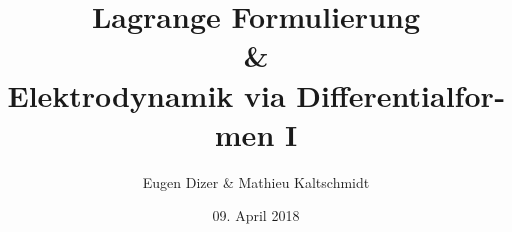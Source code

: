 \title{Lagrange Formulierung \\  \& \\  Elektrodynamik via Differentialformen I}
\author{Eugen Dizer \& Mathieu Kaltschmidt}
\date{09. April 2018}

\usepackage[charter]{mathdesign}
\usepackage{amsmath}

\usepackage{fontspec} 
\usepackage{polyglossia}
\setmainlanguage{german}
\usepackage{microtype}

\usepackage{geometry}
\usepackage{xcolor}
\usepackage{graphicx}
\usepackage{float}

\usepackage[colorlinks=True]{hyperref}
\hypersetup{allcolors=myred}

